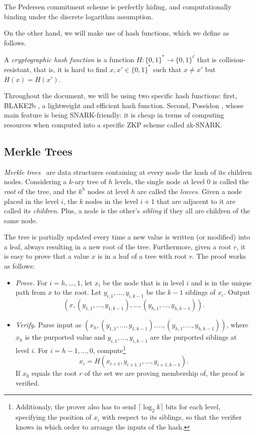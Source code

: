 The Pedersen commitment scheme is perfectly hiding, and computationally binding under the discrete logarithm assumption.

On the other hand, we will make use of hash functions, which we define as follows.

\begin{definition} A \emph{cryptographic hash function} is a function $H:\{0,1\}^*\rightarrow\{0,1\}^\ell$ that is collision-resistant, that is, it is hard to find $x,x'\in\{0,1\}^*$ such that $x\neq x'$ but $H(x)=H(x')$. 
\end{definition}

Throughout the document, we will be using two specific hash functions: first, BLAKE2b \cite{blake2}, a lightweight and efficient hash function. Second, Poseidon \cite{cryptoeprint:2019:458}, whose main feature is being SNARK-friendly: it is cheap in terms of computing resources when computed into a specific ZKP scheme called zk-SNARK.

\subsection{Merkle Trees}

\emph{Merkle trees}~\cite{merkle1987digital} are data structures containing at every node the hash of its children nodes. Considering a $k$-ary tree of $h$ levels, the single node at level $0$ is called the \emph{root} of the tree, and the $k^{h}$ nodes at level $h$ are called the \emph{leaves}. Given a node placed in the level $i$, the $k$ nodes in the level $i+1$ that are adjacent to it are called its \emph{children}. Plus, a node is the other's \emph{sibling} if they all are children of the same node.

The tree is partially updated every time a new value is written (or modified) into a leaf, always resulting in a new root of the tree. Furthermore, given a root $r$, it is easy to prove that a value $x$ is in a leaf of a tree with root $r$. The proof works as follows: 
\begin{itemize}
  \item \emph{Prove.} For $i=h,\dots,1$, let $x_i$ be the node that is in level $i$ and is in the unique path from $x$ to the root. Let $y_{i, 1},\dots, y_{i, k-1}$ be the $k-1$ siblings of $x_i$. Output
  \[(x, (y_{1,1}, \dots, y_{1,k-1}), \dots, (y_{h,1},\dots,y_{h,k-1})).\]
  \item \emph{Verify}. Parse input as $(x_h, (y_{1,1}, \dots, y_{1,k-1}), \dots, (y_{h,1},\dots,y_{h,k-1}))$, where $x_h$ is the purported value and $y_{i,1},\dots,y_{i,k-1}$ are the purported siblings at level $i$. For $i=h-1,\dots, 0$, compute\footnote{Additionaly, the prover also has to send $\lceil\log_2k\rceil$ bits for each level, specifying the position of $x_i$ with respect to its siblings, so that the verifier knows in which order to arrange the inputs of the hash.}
  \[x_i = H\left( x_{i+1}, y_{i+1,1},\dots,y_{i+1,k-1} \right).\] 
  If $x_0$ equals the root $r$ of the set we are proving membership of, the proof is verified.
\end{itemize}

